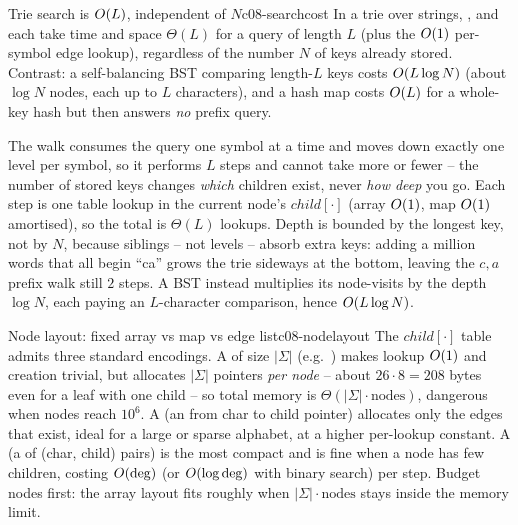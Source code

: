 \begin{theorem}{Trie search is $O(L)$, independent of $N$}{c08-searchcost}
In a trie over strings, ,  and  each take time and space
$\Theta(L)$ for a query of length $L$ (plus the $O(1)$ per-symbol edge lookup), regardless of the
number $N$ of keys already stored. Contrast: a self-balancing BST comparing length-$L$ keys costs
$O(L\log N)$ (about $\log N$ nodes, each up to $L$ characters), and a hash map costs $O(L)$ for a
whole-key hash but then answers \emph{no} prefix query.
\end{theorem}
\begin{proofbox}
The walk consumes the query one symbol at a time and moves down exactly one level per symbol, so it
performs $L$ steps and cannot take more or fewer -- the number of stored keys changes \emph{which}
children exist, never \emph{how deep} you go. Each step is one table lookup in the current node's
$\mathit{child}[\cdot]$ (array $O(1)$, map $O(1)$ amortised), so the total is $\Theta(L)$ lookups.
Depth is bounded by the longest key, not by $N$, because siblings -- not levels -- absorb extra keys:
adding a million words that all begin ``ca'' grows the trie sideways at the bottom, leaving the $c,a$
prefix walk still $2$ steps. A BST instead multiplies its node-visits by the depth $\log N$, each paying
an $L$-character comparison, hence $O(L\log N)$. \end{proofbox}

\begin{definition}{Node layout: fixed array vs map vs edge list}{c08-nodelayout}
The $\mathit{child}[\cdot]$ table admits three standard encodings. A  of size
$|\Sigma|$ (e.g.\ ) makes lookup $O(1)$ and creation trivial, but allocates
$|\Sigma|$ pointers \emph{per node} -- about $26\cdot 8=208$ bytes even for a leaf with one child -- so
total memory is $\Theta(|\Sigma|\cdot\text{nodes})$, dangerous when nodes reach $10^6$. A
 (an  from char to child pointer) allocates only the edges that exist,
ideal for a large or sparse alphabet, at a higher per-lookup constant. A 
(a  of (char, child) pairs) is the most compact and is fine when a node has few children,
costing $O(\deg)$ (or $O(\log\deg)$ with binary search) per step. Budget nodes first: the array layout
fits roughly when $|\Sigma|\cdot\text{nodes}$ stays inside the memory limit.
\end{definition}

